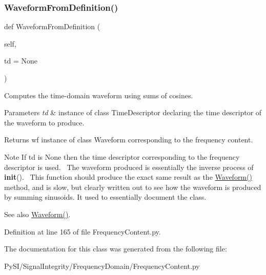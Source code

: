 \subsubsection{\texorpdfstring{Waveform\+From\+Definition()}{WaveformFromDefinition()}}
{\footnotesize\ttfamily def Waveform\+From\+Definition (\begin{DoxyParamCaption}\item[{}]{self,  }\item[{}]{td = {\ttfamily None} }\end{DoxyParamCaption})}



Computes the time-\/domain waveform using sums of cosines. 


\begin{DoxyParams}{Parameters}
{\em td} & instance of class Time\+Descriptor declaring the time descriptor of the waveform to produce. \\
\hline
\end{DoxyParams}
\begin{DoxyReturn}{Returns}
wf instance of class Waveform corresponding to the frequency content. 
\end{DoxyReturn}
\begin{DoxyNote}{Note}
If td is None then the time descriptor corresponding to the frequency descriptor is used.~\newline
 The waveform produced is essentially the inverse process of {\bfseries init}().~\newline
 This function should produce the exact same result as the \hyperlink{classSignalIntegrity_1_1FrequencyDomain_1_1FrequencyContent_1_1FrequencyContent_af833a7687c414346de1e2ffab6b47d5c}{Waveform()} method, and is slow, but clearly written out to see how the waveform is produced by summing sinusoids. It used to essentially document the class.~\newline
 
\end{DoxyNote}
\begin{DoxySeeAlso}{See also}
\hyperlink{classSignalIntegrity_1_1FrequencyDomain_1_1FrequencyContent_1_1FrequencyContent_af833a7687c414346de1e2ffab6b47d5c}{Waveform()}. 
\end{DoxySeeAlso}


Definition at line 165 of file Frequency\+Content.\+py.



The documentation for this class was generated from the following file\+:\begin{DoxyCompactItemize}
\item 
Py\+S\+I/\+Signal\+Integrity/\+Frequency\+Domain/Frequency\+Content.\+py\end{DoxyCompactItemize}
